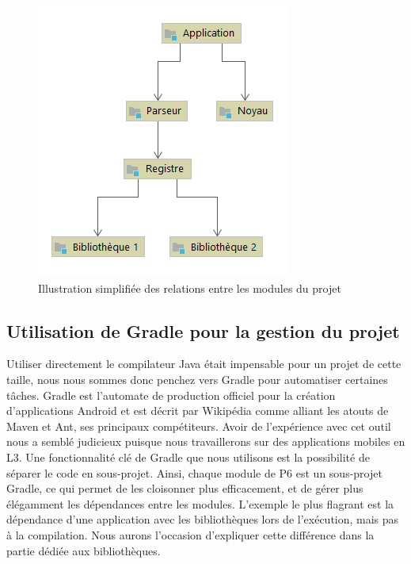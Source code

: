 \documentclass[a4paper, 12pt]{article}
\begin{document}
\begin{figure}[!ht]
  \centering
  \includegraphics[scale=0.8]{./img/Structure.png}
  \caption{Illustration simplifiée des relations entre les modules du projet}
\end{figure}

\subsection{Utilisation de Gradle pour la gestion du projet}
Utiliser directement le compilateur Java était impensable pour un projet de cette taille, nous nous sommes donc penchez vers Gradle pour automatiser certaines tâches. Gradle est l’automate de production officiel pour la création d’applications Android et est décrit par Wikipédia comme alliant les atouts de Maven et Ant, ses principaux compétiteurs. Avoir de l’expérience avec cet outil nous a semblé judicieux puisque nous travaillerons sur des applications mobiles en L3.
Une fonctionnalité clé de Gradle que nous utilisons est la possibilité de séparer le code en sous-projet. Ainsi, chaque module de P6 est un sous-projet Gradle, ce qui permet de les cloisonner plus efficacement, et de gérer plus élégamment les dépendances entre les modules. L’exemple le plus flagrant est la dépendance d’une application avec les bibliothèques lors de l’exécution, mais pas à la compilation. Nous aurons l’occasion d’expliquer cette différence dans la partie dédiée aux bibliothèques.
\pagebreak
\end{document}
